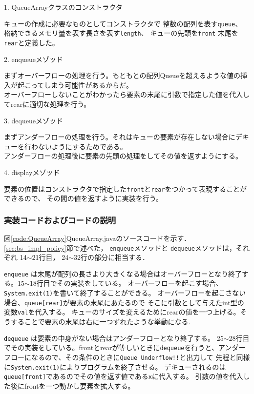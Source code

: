 \documentclass[10.5pt,a4paper]{jsarticle}
\newcommand{\figref}[1]{図\ref{#1}}
\newcommand{\secref}[1]{\ref{#1}節}
\begin{document}
1. QueueArrayクラスのコンストラクタ

キューの作成に必要なものとしてコンストラクタで
整数の配列を表す\texttt{queue}、
格納できるメモリ量を表す長さを表す\texttt{length}、
キューの先頭を\texttt{front}
末尾を\texttt{rear}と定義した。

2. enqueueメゾッド

まずオーバーフローの処理を行う。もともとの配列Queueを超えるような値の挿入が起こってしまう可能性があるからだ。\\
オーバーフローしないことがわかったら要素の末尾に引数で指定した値を代入してrearに適切な処理を行う。

3. dequeueメゾッド

まずアンダーフローの処理を行う。それはキューの要素が存在しない場合にデキューを行わないようにするためである。\\
アンダーフローの処理後に要素の先頭の処理をしてその値を返すようにする。

4. displayメゾッド

要素の位置はコンストラクタで指定した\texttt{front}と\texttt{rear}をつかって表現することができるので、
その間の値を返すように実装を行う。

\subsubsection{実装コードおよびコードの説明}

\figref{code:QueueArray}QueueArray.javaのソースコードを示す．
\secref{sec:bs_impl_policy}で述べた，
\texttt{enqueue}メソッドと
\texttt{dequeue}メソッドは，それぞれ
14$\sim$21行目，
24$\sim$32行の部分に相当する．

\texttt{enqueue}
は末尾が配列の長さより大きくなる場合はオーバーフローとなり終了する。15$\sim$18行目でその実装をしている。
オーバーフローを起こす場合、\texttt{System.exit(1)}を書いて終了することができる。
オーバーフローを起こさない場合、\texttt{queue[rear]}が要素の末尾にあたるので
そこに引数として与えたint型の変数\texttt{val}を代入する。
キューのサイズを変えるためにrearの値を一つ上げる。そうすることで要素の末尾は右に一つずれたような挙動になる.

\texttt{dequeue}
は要素の中身がない場合はアンダーフローとなり終了する。
25$\sim$28行目でその実装をしている。frontとrearが等しいときに\texttt{dequeue}を行うと、アンダーフローになるので、その条件のときに\texttt{Queue Underflow!!}と出力して
先程と同様に\texttt{System.exit(1)}によりプログラムを終了させる。
デキューされるのは\texttt{queue[front]}であるのでその値を返す値である\texttt{x}に代入する。
引数の値を代入した後にfrontを一つ動かし要素を拡大する。
\end{document}
